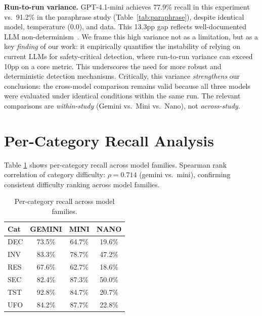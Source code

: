 \documentclass{article}
\begin{document}
\label{app:variance}
\textbf{Run-to-run variance.} GPT-4.1-mini achieves 77.9\% recall in this experiment vs.\ 91.2\% in the paraphrase study (Table~\ref{tab:paraphrase}), despite identical model, temperature (0.0), and data. This 13.3pp gap reflects well-documented LLM non-determinism~\citep{chen2024chatgpt}. We frame this high variance not as a limitation, but as a key \emph{finding} of our work: it empirically quantifies the instability of relying on current LLMs for safety-critical detection, where run-to-run variance can exceed 10pp on a core metric. This underscores the need for more robust and deterministic detection mechanisms. Critically, this variance \emph{strengthens} our conclusions: the cross-model comparison remains valid because all three models were evaluated under identical conditions within the same run. The relevant comparisons are \emph{within-study} (Gemini vs.\ Mini vs.\ Nano), not \emph{across-study}.

\section{Per-Category Recall Analysis}
\label{app:per_cat_recall}

Table \ref{tab:per_category_recall} shows per-category recall across model families. Spearman rank correlation of category difficulty: $\rho = 0.714$ (gemini vs.\ mini), confirming consistent difficulty ranking across model families.

\begin{table}[h]
\caption{Per-category recall across model families.}
\label{tab:per_category_recall}
\vskip 0.15in
\begin{center}
\begin{small}
\begin{sc}
\begin{tabular}{lccc}
\toprule
Cat & GEMINI & MINI & NANO \\
\midrule
DEC & 73.5\% & 64.7\% & 19.6\% \\
INV & 83.3\% & 78.7\% & 47.2\% \\
RES & 67.6\% & 62.7\% & 18.6\% \\
SEC & 82.4\% & 87.3\% & 50.0\% \\
TST & 92.8\% & 84.7\% & 20.7\% \\
UFO & 84.2\% & 87.7\% & 22.8\% \\
\bottomrule
\end{tabular}
\end{sc}
\end{small}
\end{center}
\vskip -0.1in
\end{table}
\end{document}
